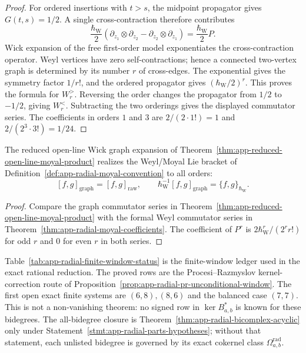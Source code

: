 \begin{proof}
  For ordered insertions with \(t>s\), the midpoint propagator gives
  \(G(t,s)=1/2\).  A single cross-contraction therefore contributes
  \[
    \frac{\hbar_{\mathrm{W}}}{2}
    \left(\partial_{z_1}\otimes\partial_{z_2}
      -\partial_{z_2}\otimes\partial_{z_1}\right)
    =\frac{\hbar_{\mathrm{W}}}{2}P.
  \]
  Wick expansion of the free first-order model exponentiates the
  cross-contraction operator.  Weyl vertices have zero
  self-contractions; hence a connected two-vertex graph is determined
  by its number \(r\) of cross-edges.  The exponential gives the
  symmetry factor \(1/r!\), and the ordered propagator gives
  \((\hbar_{\mathrm{W}}/2)^r\).  This proves the formula for \(W_r^{>}\).  Reversing
  the order changes the propagator from \(1/2\) to \(-1/2\), giving
  \(W_r^{<}\).  Subtracting the two orderings gives the displayed
  commutator series.  The coefficients in orders \(1\) and \(3\) are
  \(2/(2\cdot1!)=1\) and \(2/(2^3\cdot3!)=1/24\).
\end{proof}

\begin{cor}
\label{cor:app-reduced-graph-realizes-moyal}
  The reduced open-line Wick graph expansion of
  Theorem~\ref{thm:app-reduced-open-line-moyal-product} realizes the
  Weyl/Moyal Lie bracket of
  Definition~\ref{def:app-radial-moyal-convention} to all orders:
  \[
    [f,g]_{\mathrm{graph}}=[f,g]_{\mathrm{raw}},\qquad
    \hbar_{\mathrm{W}}^{-1}[f,g]_{\mathrm{graph}}=\{f,g\}_{\hbar_{\mathrm{W}}} .
  \]
\end{cor}

\begin{proof}
  Compare the graph commutator series in
  Theorem~\ref{thm:app-reduced-open-line-moyal-product} with the formal
  Weyl commutator series in
  Theorem~\ref{thm:app-radial-moyal-coefficients}.  The coefficient of
  \(P^r\) is \(2\hbar_{\mathrm{W}}^r/(2^r r!)\) for odd \(r\) and \(0\) for even
  \(r\) in both series.
\end{proof}

\begin{rmk}
\label{rmk:app-radial-finite-verification}
  Table~\ref{tab:app-radial-finite-window-status} is the finite-window
  ledger used in the exact rational reduction.  The proved rows are the
  Procesi--Razmyslov kernel-correction route of
  Proposition~\ref{prop:app-radial-pr-unconditional-window}.  The first
  open exact finite systems are \((6,8),(8,6)\) and the balanced case
  \((7,7)\).  This is not a non-vanishing theorem: no signed row in
  \(\ker B_{a,b}^*\) is known for these bidegrees.
  The all-bidegree closure is
  Theorem~\ref{thm:app-radial-bicomplex-acyclic} only under
  Statement~\ref{stmt:app-radial-parts-hypotheses}; without that
  statement, each unlisted bidegree is governed by its exact cokernel
  class \(\Omega^{\mathrm{rad}}_{a,b}\).
\end{rmk}

